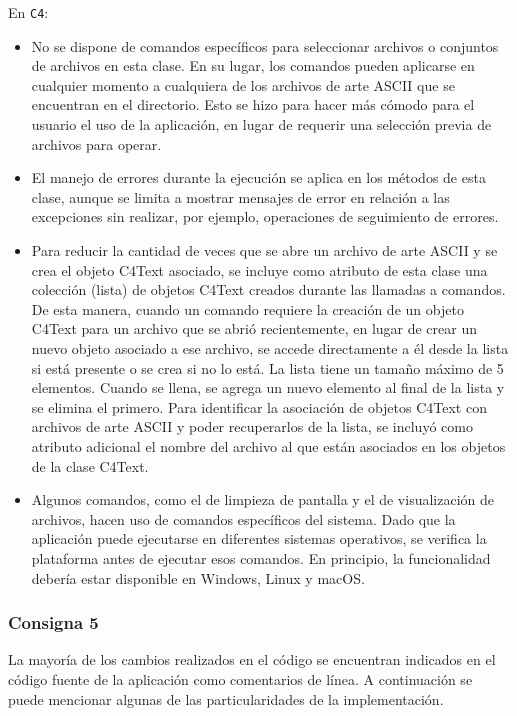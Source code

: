 \documentclass[a4paper,12pt]{article}
\begin{document}
En \texttt{C4}:
\begin{itemize}
    \item No se dispone de comandos específicos para seleccionar archivos o conjuntos de archivos en esta clase. En su lugar, los comandos pueden aplicarse en cualquier momento a cualquiera de los archivos de arte ASCII que se encuentran en el directorio. Esto se hizo para hacer más cómodo para el usuario el uso de la aplicación, en lugar de requerir una selección previa de archivos para operar.
    \item El manejo de errores durante la ejecución se aplica en los métodos de esta clase, aunque se limita a mostrar mensajes de error en relación a las excepciones sin realizar, por ejemplo, operaciones de seguimiento de errores.
    \item Para reducir la cantidad de veces que se abre un archivo de arte ASCII y se crea el objeto C4Text asociado, se incluye como atributo de esta clase una colección (lista) de objetos C4Text creados durante las llamadas a comandos. De esta manera, cuando un comando requiere la creación de un objeto C4Text para un archivo que se abrió recientemente, en lugar de crear un nuevo objeto asociado a ese archivo, se accede directamente a él desde la lista si está presente o se crea si no lo está. La lista tiene un tamaño máximo de 5 elementos. Cuando se llena, se agrega un nuevo elemento al final de la lista y se elimina el primero. Para identificar la asociación de objetos C4Text con archivos de arte ASCII y poder recuperarlos de la lista, se incluyó como atributo adicional el nombre del archivo al que están asociados en los objetos de la clase C4Text.
    \item Algunos comandos, como el de limpieza de pantalla y el de visualización de archivos, hacen uso de comandos específicos del sistema. Dado que la aplicación puede ejecutarse en diferentes sistemas operativos, se verifica la plataforma antes de ejecutar esos comandos. En principio, la funcionalidad debería estar disponible en Windows, Linux y macOS.
\end{itemize}


\subsubsection{Consigna 5}
La mayoría de los cambios realizados en el código se encuentran indicados en el código fuente de la aplicación como comentarios de línea.
A continuación se puede mencionar algunas de las particularidades de la implementación.
\end{document}
